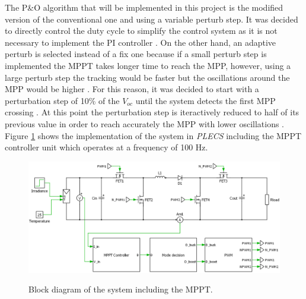 The P\&O algorithm that will be implemented in this project is the modified version of the conventional one and using a variable perturb step. It was decided to directly control the duty cycle to simplify the control system as it is not necessary to implement the PI controller . On the other hand, an adaptive perturb is selected instead of a fix one because if a small perturb step is implemented the MPPT takes longer time to reach the MPP, however, using a large perturb step the tracking would be faster but the oscillations around the MPP would be higher . For this reason, it was decided to start with a perturbation step of 10\% of the $V_{oc}$ until the system detects the first MPP crossing . At this point the perturbation step is iteractively reduced to half of its previous value in order to reach accurately the MPP with lower oscillations . Figure \ref{BD_POalgorithm} shows the implementation of the system in \textit{PLECS} including the MPPT controller unit which operates at a frequency of 100 Hz. 

\begin{figure}[H]
	\begin{center}
		\includegraphics[width=\textwidth]{../Pictures/BD_implementation_POalgorithm}
		\caption{Block diagram of the system including the MPPT.}
		\label{BD_POalgorithm}
	\end{center}	
\end{figure}

